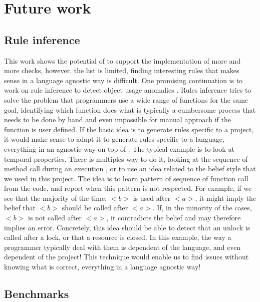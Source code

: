 \section{Future work}
\label{sec:future_work}

\subsection{Rule inference}
\label{subsec:rule_inference}

This work shows the potential of \slang{} to support the implementation of more and more checks, however, the list is limited, finding interesting rules that makes sense in a language agnostic way is difficult. 
One promising continuation is to work on rule inference to detect object usage anomalies \cite{Wasylkowski:2007:DOU:1287624.1287632}. \newline
Rules inference tries to solve the problem that programmers use a wide range of functions for the same goal, identifying which function does what is typically a cumbersome process that needs to be done by hand and even impossible for manual approach if the function is user defined. 
If the basic idea is to generate rules specific to a project, it would make sense to adapt it to generate rules specific to a language, everything in an agnostic way on top of \slang{}. 
The typical example is to look at temporal properties. 
There is multiples way to do it, looking at the sequence of method call during an execution \cite{Gabel:2010:OIE:1806799.1806806}, or to use an idea related to the belief style \cite{Engler:2001:BDB:502059.502041} that we used in this project. 
The idea is to learn pattern of sequence of function call from the code, and report when this pattern is not respected.
For example, if we see that the majority of the time, \emph{$<b>$} is used after \emph{$<a>$}, it might imply the belief that \emph{$<b>$} should be called after \emph{$<a>$}. If, in the minority of the cases, \emph{$<b>$} is not called after \emph{$<a>$}, it contradicts the belief and may therefore implies an error. 
Concretely, this idea should be able to detect that an unlock is called after a lock, or that a resource is closed. 
In this example, the way a programmer typically deal with them is dependent of the language, and even dependent of the project! \newline
This technique would enable us to find issues without knowing what is correct, everything in a language agnostic way!

\subsection{Benchmarks}
\label{subsec:benchmarks}

